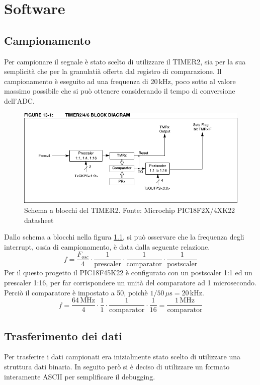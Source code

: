 \chapter{Software}
\section{Campionamento} \label{sec:sampling}
Per campionare il segnale \`e stato scelto di utilizzare il TIMER2, sia per la
sua semplicit\`a che per la granulati\`a offerta dal registro di comparazione.
Il campionamento \`e eseguito ad una frequenza di 20\,kHz, poco sotto al
valore massimo possibile che si pu\`o ottenere considerando il tempo di
conversione dell'ADC.

\begin{figure}[H] \centering
    \includegraphics[width=.9\linewidth]{figures/timer2-block-diagram}
    \caption[Schema a blocchi del TIMER2]{
        Schema a blocchi del TIMER2. Fonte: Microchip PIC18F2X/4XK22 datasheet
        \label{fig:timer2-diagram}
    }
\end{figure}

Dallo schema a blocchi nella figura \ref{fig:timer2-diagram}, si pu\`o
osservare che la frequenza degli interrupt, ossia di campionamento, \`e data
dalla seguente relazione.
\[
    f = \frac{F_{osc}}{4}\cdot
        \frac{1}{\textrm{prescaler}}\cdot
        \frac{1}{\textrm{comparator}}\cdot
        \frac{1}{\textrm{postscaler}}
\]
Per il questo progetto il PIC18F45K22 \`e configurato con un postscaler 1:1 ed
un prescaler 1:16, per far corrispondere un unit\`a del comparatore ad 1
microsecondo. Perci\`o il comparatore \`e impostato a 50, poich\`e
\(1/50\,\mu\textrm{s} = 20\,\textrm{kHz}\).
\[ 
    f = \frac{64\,\textrm{MHz}}{4}\cdot
        \frac{1}{1}\cdot
        \frac{1}{\textrm{comparator}}\cdot
        \frac{1}{16}
      = \frac{1\,\textrm{MHz}}{\textrm{comparator}}
\]

\section{Trasferimento dei dati}
Per trasferire i dati campionati era inizialmente stato scelto di utilizzare
una struttura dati binaria. In seguito per\`o si \`e deciso di utilizzare un
formato interamente ASCII per semplificare il debugging.

